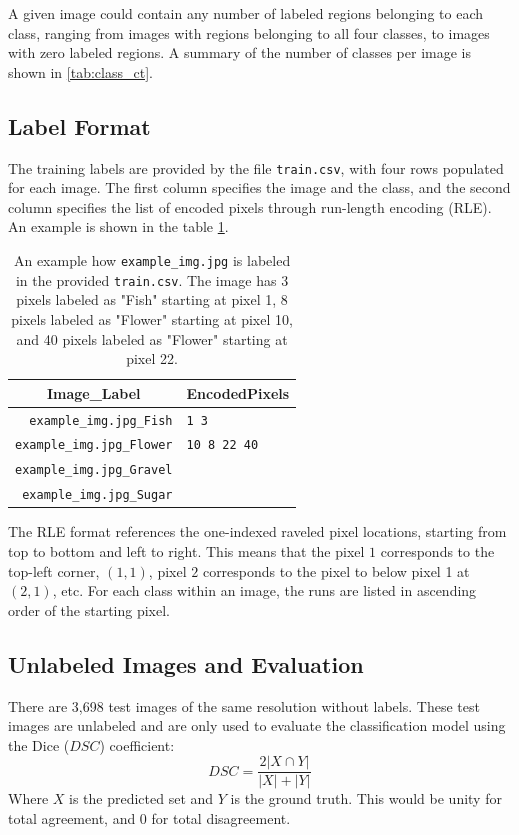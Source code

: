 A given image could contain any number of labeled regions belonging to each class, ranging from images with regions belonging to all four classes, to images with zero labeled regions. A summary of the number of classes per image is shown in \cref{tab:class_ct}.

\subsection*{Label Format}
The training labels are provided by the file \texttt{train.csv}, with four rows populated for each image. The first column specifies the image and the class, and the second column specifies the list of encoded pixels through run-length encoding (RLE). An example is shown in the table \cref{tab:RLE_ex}.
%
\begin{table}[h!]
    \centering
    \begin{tabular}{r|l}
    \multicolumn{1}{c|}{Image\_Label} & \multicolumn{1}{c}{EncodedPixels} \\ \hline
    \texttt{example\_img.jpg\_Fish}   & \texttt{1 3}        \\ \hline
    \texttt{example\_img.jpg\_Flower} & \texttt{10 8 22 40} \\ \hline
    \texttt{example\_img.jpg\_Gravel} &                                      \\ \hline
    \texttt{example\_img.jpg\_Sugar}  &                                     
    \end{tabular}
    \caption{An example how \texttt{example\_img.jpg} is labeled in the provided \texttt{train.csv}. The image has 3 pixels labeled as "Fish" starting at pixel 1, 8 pixels labeled as "Flower" starting at pixel 10, and 40 pixels labeled as "Flower" starting at pixel 22.}
    \label{tab:RLE_ex}
\end{table}

The RLE format references the one-indexed raveled pixel locations, starting from top to bottom and left to right. This means that the pixel \(1\) corresponds to the top-left corner, \((1,1)\), pixel \(2\) corresponds to the pixel to below pixel 1 at \((2, 1)\), etc. For each class within an image, the runs are listed in ascending order of the starting pixel. 
% 
\subsection*{Unlabeled Images and Evaluation}
There are 3,698 test images of the same resolution without labels. These test images are unlabeled and are only used to evaluate the classification model using the Dice (\(DSC\)) coefficient: 
%
\begin{equation*}
    DSC = \frac{2 | X \cap Y |}{|X| + |Y|}
\end{equation*}
%
Where \(X\) is the predicted set and \(Y\) is the ground truth. This would be unity for total agreement, and 0 for total disagreement. 

